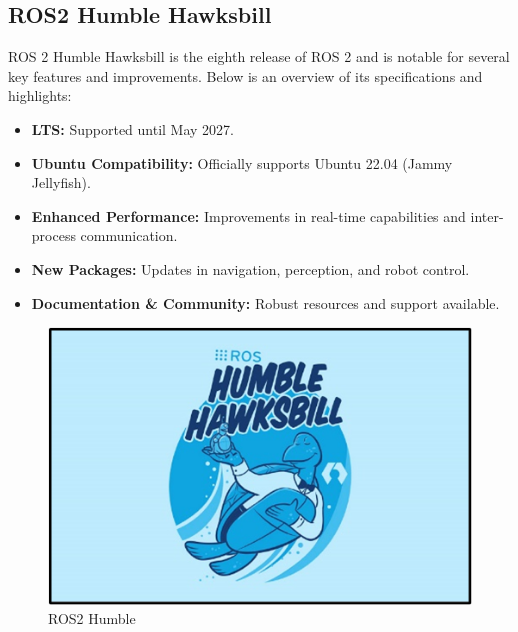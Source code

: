 \subsection{\fontsize{14}{16} ROS2 Humble Hawksbill}
{
	\fontsize{12}{14}
	ROS 2 Humble Hawksbill is the eighth release of ROS 2 and is notable for several key features and improvements. Below is an overview of its specifications and highlights:
	\begin{itemize}
		\item \textbf{LTS:} Supported until May 2027.
		\item \textbf{Ubuntu Compatibility:} Officially supports Ubuntu 22.04 (Jammy Jellyfish).
		\item \textbf{Enhanced Performance:} Improvements in real-time capabilities and inter-process 		communication.
		\item \textbf{New Packages:} Updates in navigation, perception, and robot control.
		\item \textbf{Documentation \& Community:} Robust resources and support available.
	\end{itemize}
	
	\begin{figure}[H]
		\centering
		\includegraphics{images/Content/ros2_humble}
		\caption{ROS2 Humble \cite{ros2_humble}}
		\label{fig:ros2humble}
	\end{figure}
}


